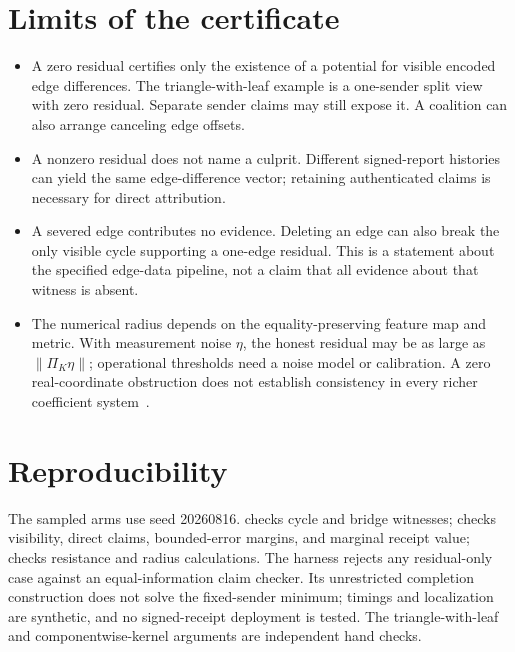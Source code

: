 \documentclass[11pt,a4paper]{article}
\begin{document}
\section{Limits of the certificate}\label{sec:boundary}

\begin{boundary}
\begin{itemize}
\item A zero residual certifies only the existence of a potential for visible encoded edge differences. The triangle-with-leaf example is a one-sender split view with zero residual. Separate sender claims may still expose it. A coalition can also arrange canceling edge offsets.
\item A nonzero residual does not name a culprit. Different signed-report histories can yield the same edge-difference vector; retaining authenticated claims is necessary for direct attribution.
\item A severed edge contributes no evidence. Deleting an edge can also break the only visible cycle supporting a one-edge residual. This is a statement about the specified edge-data pipeline, not a claim that all evidence about that witness is absent.
\item The numerical radius depends on the equality-preserving feature map and metric. With measurement noise $\eta$, the honest residual may be as large as $\|\Pi_K\eta\|$; operational thresholds need a noise model or calibration. A zero real-coordinate obstruction does not establish consistency in every richer coefficient system~\cite{caru}.
\end{itemize}
\end{boundary}

\section*{Reproducibility}

The sampled arms use seed 20260816.  checks cycle and bridge witnesses;
 checks visibility, direct claims, bounded-error margins, and marginal receipt value;
 checks resistance and radius calculations. The harness rejects any residual-only
case against an equal-information claim checker. Its unrestricted completion construction does not solve the
fixed-sender minimum; timings and localization are synthetic, and no signed-receipt deployment is tested. The
triangle-with-leaf and componentwise-kernel arguments are independent hand checks.
\end{document}
